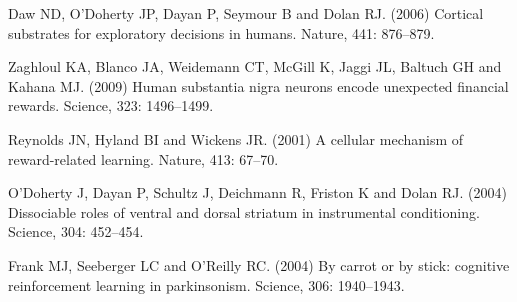 \documentclass[11pt,a4paper]{scrartcl}
\begin{document}
\begin{thebibliography}{10}

Daw ND, O'Doherty JP, Dayan P, Seymour B and Dolan RJ. (2006) Cortical substrates for exploratory decisions in humans. 
\newblock Nature, 441: 876--879.

Zaghloul KA, Blanco JA, Weidemann CT, McGill K, Jaggi JL, Baltuch GH and Kahana MJ. (2009) Human substantia nigra neurons encode unexpected financial rewards. 
\newblock Science, 323: 1496--1499.

Reynolds JN, Hyland BI and Wickens JR. (2001) A cellular mechanism of reward-related learning. 
\newblock Nature, 413: 67--70.

O'Doherty J, Dayan P, Schultz J, Deichmann R, Friston K and Dolan RJ. (2004) Dissociable roles of ventral and dorsal striatum in instrumental conditioning. 
\newblock Science, 304: 452--454.

Frank MJ, Seeberger LC and O'Reilly RC. (2004) By carrot or by stick: cognitive reinforcement learning in parkinsonism. 
\newblock Science, 306: 1940--1943.

\end{thebibliography}
\end{document}
